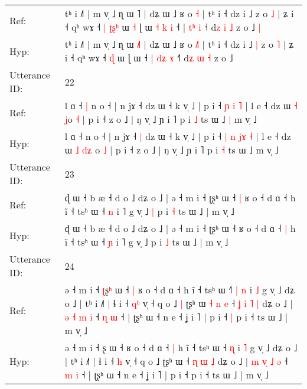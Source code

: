 \documentclass[10pt]{article}
\DeclareRobustCommand{\hl}[1]{{\textcolor{red}{#1}}}
\begin{document}
\begin{longtable}{ll}
Ref: & tʰ i ˩˥ | m v̩ ˩ ɳ ɯ \hl{}˥ | dʑ ɯ ˩ ʁ o \hl{}\hl{˧} | tʰ i ˧ dz i ˩\hl{}\hl{} z o \hl{˩} | ʑ i ˧ qʰ wɤ ˧\hl{ }\hl{|} \hl{ʈ}\hl{ʂ}\hl{ʰ} ɯ\hl{ }\hl{˧} ɭ ɯ\hl{ }\hl{˧}\hl{ }\hl{k}\hl{ }\hl{i} ˧ | \hl{t}\hl{ʰ} \hl{i} ˧\hl{} d\hl{z} \hl{i} \hl{˩} z o ˩\hl{ }\hl{|}
 \\
Hyp: & tʰ i ˩˥ | m v̩ ˩ ɳ ɯ \hl{˩}˥ | dʑ ɯ ˩ ʁ o \hl{˩}\hl{˥} | tʰ i ˧ dz i ˩\hl{ }\hl{|} z o \hl{˥} | ʑ i ˧ qʰ wɤ ˧\hl{}\hl{} \hl{}\hl{}\hl{ɖ} ɯ\hl{}\hl{} ɭ ɯ\hl{}\hl{}\hl{}\hl{}\hl{}\hl{} ˧ | \hl{d}\hl{ʑ} \hl{ɤ} ˧\hl{˥} d\hl{ʑ} \hl{ɯ} \hl{˧} z o ˩\hl{}\hl{}
 \\
\midrule
Utterance ID: & 22 \\
Ref: & l ɑ ˧\hl{ }\hl{|} n o ˧ | n jɤ ˧\hl{}\hl{} dz ɯ ˧ k v̩ ˩ | p i ˧\hl{}\hl{} \hl{ɲ} \hl{}\hl{i} \hl{˥} | l e ˧ dz ɯ \hl{˧} \hl{}\hl{}\hl{j}o \hl{˧} | p i ˧ z o ˩ | ŋ v̩ ˩ ɲ i ˥ p i \hl{˩} ts ɯ ˩\hl{ }\hl{|} m v̩ ˩
 \\
Hyp: & l ɑ ˧\hl{}\hl{} n o ˧ | n jɤ ˧\hl{ }\hl{|} dz ɯ ˧ k v̩ ˩ | p i ˧\hl{ }\hl{|} \hl{n} \hl{j}\hl{ɤ} \hl{˧} | l e ˧ dz ɯ \hl{˩} \hl{d}\hl{ʑ}\hl{ }o \hl{˩} | p i ˧ z o ˩ | ŋ v̩ ˩ ɲ i ˥ p i \hl{˧} ts ɯ ˩\hl{}\hl{} m v̩ ˩
 \\
\midrule
Utterance ID: & 23 \\
Ref: & ɖ ɯ ˧ b æ ˧ d o ˩ dʑ o ˩ | ə ˧ m i ˧ ʈʂʰ ɯ ˧\hl{ }\hl{|} ʁ o ˧ d ɑ ˧\hl{}\hl{} h ĩ ˧ tsʰ ɯ ˧ \hl{n} i ˥ g v̩ ˩\hl{ }\hl{|} p i \hl{˧} ts ɯ ˩ | m v̩ ˩
 \\
Hyp: & ɖ ɯ ˧ b æ ˧ d o ˩ dʑ o ˩ | ə ˧ m i ˧ ʈʂʰ ɯ ˧\hl{}\hl{} ʁ o ˧ d ɑ ˧\hl{ }\hl{|} h ĩ ˧ tsʰ ɯ ˧ \hl{ɲ} i ˥ g v̩ ˩\hl{}\hl{} p i \hl{˩} ts ɯ ˩ | m v̩ ˩
 \\
\midrule
Utterance ID: & 24 \\
Ref: & ə ˧ m i ˧ \hl{ʈ}ʂ\hl{ʰ} ɯ ˧\hl{ }\hl{|} ʁ o ˧ d ɑ ˧\hl{}\hl{} h ĩ ˧ tsʰ ɯ ˧\hl{˥}\hl{ }\hl{|} \hl{n} i \hl{˩} g v̩ ˩ dʑ o ˩ | tʰ i ˩˥ | ɬ i ˧ \hl{q}\hl{ʰ} v̩ ˧ q o ˩\hl{ }\hl{|} ʈʂʰ ɯ\hl{ }\hl{˧}\hl{ }\hl{n}\hl{ }\hl{e} ˧\hl{ }\hl{ʝ} \hl{i} \hl{˥} \hl{|} dʑ o ˩ | \hl{ə} \hl{}\hl{˧} \hl{m} \hl{i} ˧ \hl{ɳ} \hl{ɯ} ˧ | ʈʂʰ ɯ ˧ n e ˧ ʝ i ˥ | p i ˧\hl{ }\hl{|} p i ˧ ts ɯ ˩ | m v̩ ˩
 \\
Hyp: & ə ˧ m i ˧ \hl{}ʂ\hl{} ɯ ˧\hl{}\hl{} ʁ o ˧ d ɑ ˧\hl{ }\hl{|} h ĩ ˧ tsʰ ɯ ˧\hl{}\hl{}\hl{} \hl{ɳ} i \hl{˥} g v̩ ˩ dʑ o ˩ | tʰ i ˩˥ | ɬ i ˧ \hl{}\hl{h} v̩ ˧ q o ˩\hl{}\hl{} ʈʂʰ ɯ\hl{}\hl{}\hl{}\hl{}\hl{}\hl{} ˧\hl{}\hl{} \hl{ɳ} \hl{ɯ} \hl{˩} dʑ o ˩ | \hl{m} \hl{v}\hl{̩} \hl{˩} \hl{ə} ˧ \hl{m} \hl{i} ˧ | ʈʂʰ ɯ ˧ n e ˧ ʝ i ˥ | p i ˧\hl{}\hl{} p i ˧ ts ɯ ˩ | m v̩ ˩
 \\

\end{longtable}
\end{document}
